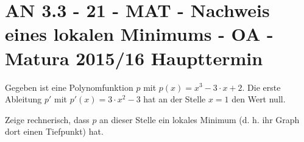 \section{AN 3.3 - 21 - MAT - Nachweis eines lokalen Minimums - OA - Matura 2015/16 Haupttermin}

\begin{beispiel}[AN 3.3]{1} %
Gegeben ist eine Polynomfunktion $p$ mit $p(x) = x^3 - 3 \cdot x + 2$. Die erste Ableitung $p'$ mit $p'(x) = 3 \cdot x^2 - 3$ hat an der Stelle $x = 1$ den Wert null.

Zeige rechnerisch, dass $p$ an dieser Stelle ein lokales Minimum (d. h. ihr Graph dort einen
Tiefpunkt) hat.

\end{beispiel}